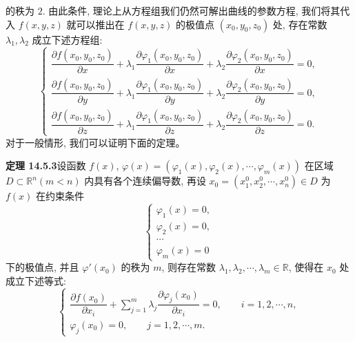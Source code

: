 \documentclass[UTF8, 12pt, fontset=fandol, oneside]{ctexart}
\begin{document}
的秩为 $2$. 由此条件, 理论上从方程组我们仍然可解出曲线的参数方程, 我们将其代入 $f(x,y,z)$ 就可以推出在 $f(x,y,z)$ 的极值点 $(x_0,y_0,z_0)$ 处, 存在常数 $\lambda_1,\lambda_2$ 成立下述方程组:
\[
  \begin{cases}
    \dfrac{\partial f(x_0,y_0,z_0)}{\partial x}
    +\lambda_1\dfrac{\partial\varphi_1(x_0,y_0,z_0)}{\partial x}
    +\lambda_2\dfrac{\partial\varphi_2(x_0,y_0,z_0)}{\partial x}=0,\\[1.2ex]
    \dfrac{\partial f(x_0,y_0,z_0)}{\partial y}
    +\lambda_1\dfrac{\partial\varphi_1(x_0,y_0,z_0)}{\partial y}
    +\lambda_2\dfrac{\partial\varphi_2(x_0,y_0,z_0)}{\partial y}=0,\\[1.2ex]
    \dfrac{\partial f(x_0,y_0,z_0)}{\partial z}
    +\lambda_1\dfrac{\partial\varphi_1(x_0,y_0,z_0)}{\partial z}
    +\lambda_2\dfrac{\partial\varphi_2(x_0,y_0,z_0)}{\partial z}=0.
  \end{cases}
\]
对于一般情形, 我们可以证明下面的定理。

\noindent\textbf{定理 14.5.3}\quad 设函数 $f(x)$, $\varphi(x)=(\varphi_1(x),\varphi_2(x),\cdots,\varphi_m(x))$ 在区域 $D\subset\mathbb R^n(m<n)$ 内具有各个连续偏导数, 再设 $x_0=(x_1^0,x_2^0,\cdots,x_n^0)\in D$ 为 $f(x)$ 在约束条件
\begin{equation}
  \begin{cases}
    \varphi_1(x)=0,\\
    \varphi_2(x)=0,\\
    \cdots\\
    \varphi_m(x)=0
  \end{cases}
  \tag{14.5.1}
\end{equation}
下的极值点, 并且 $\varphi'(x_0)$ 的秩为 $m$, 则存在常数 $\lambda_1,\lambda_2,\cdots,\lambda_m\in\mathbb R$, 使得在 $x_0$ 处成立下述等式:
\begin{equation}
  \begin{cases}
    \dfrac{\partial f(x_0)}{\partial x_i}
    +\displaystyle\sum_{j=1}^m\lambda_j
    \dfrac{\partial\varphi_j(x_0)}{\partial x_i}=0,
    \qquad i=1,2,\cdots,n,\\[1.2ex]
    \varphi_j(x_0)=0,\qquad j=1,2,\cdots,m.
  \end{cases}
  \tag{14.5.2}
\end{equation}
\end{document}
